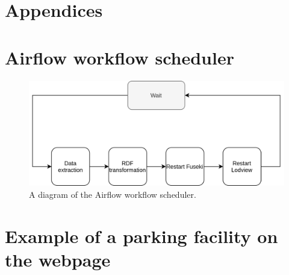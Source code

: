 \chapter*{Appendices}
\appendix

\chapter{Airflow workflow scheduler}
\label{appendix:airflow}

\begin{figure}[H]
	\centering
	\includegraphics[width=\linewidth]{figures/airflow.png}
	\caption{A diagram of the Airflow workflow scheduler.}
\end{figure}

\chapter{Example of a parking facility on the webpage}
\label{appendix:webpage}

